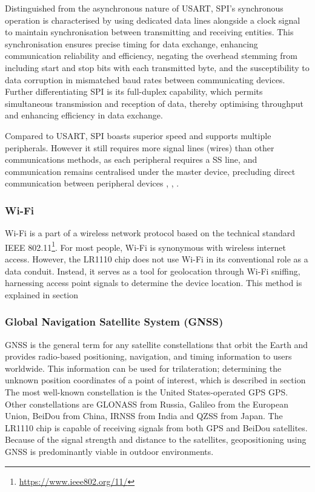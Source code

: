Distinguished from the asynchronous nature of \ac{USART}, \ac{SPI}'s synchronous operation is characterised by using dedicated data lines alongside a clock signal to maintain synchronisation between transmitting and receiving entities. This synchronisation ensures precise timing for data exchange, enhancing communication reliability and efficiency, negating the overhead stemming from including start and stop bits with each transmitted byte, and the susceptibility to data corruption in mismatched baud rates between communicating devices.
Further differentiating \ac{SPI} is its full-duplex capability, which permits simultaneous transmission and reception of data, thereby optimising throughput and enhancing efficiency in data exchange.

Compared to \ac{USART}, \ac{SPI} boasts superior speed and supports multiple peripherals. However it still requires more signal lines (wires) than other communications methods, as each peripheral requires a \ac{SS} line, and communication remains centralised under the master device, precluding direct communication between peripheral devices \cite{SPI_analog}, \cite{SPI_sparkfun}, \cite{SPI_wiki}.

\subsubsection{Wi-Fi}
Wi-Fi is a part of a wireless network protocol based on the technical standard IEEE 802.11\footnote{\url{https://www.ieee802.org/11/}}. For most people, Wi-Fi is synonymous with wireless internet access. However, the LR1110 chip does not use Wi-Fi in its conventional role as a data conduit. Instead, it serves as a tool for geolocation through Wi-Fi sniffing, harnessing access point signals to determine the device location. This method is explained in section %

\subsubsection{Global Navigation Satellite System (GNSS)}
\ac{GNSS} is the general term for any satellite constellations that orbit the Earth and provides radio-based positioning, navigation, and timing information to users worldwide. This information can be used for trilateration; determining the unknown position coordinates of a point of interest, which is described in section %
The most well-known constellation is the United States-operated \ac{GPS} \ac{GPS}. Other constellations are GLONASS from Russia, Galileo from the European Union, BeiDou from China, IRNSS from India and QZSS from Japan. The LR1110 chip is capable of receiving signals from both \ac{GPS} and BeiDou satellites.
Because of the signal strength and distance to the satellites, geopositioning using GNSS is predominantly viable in outdoor environments.

